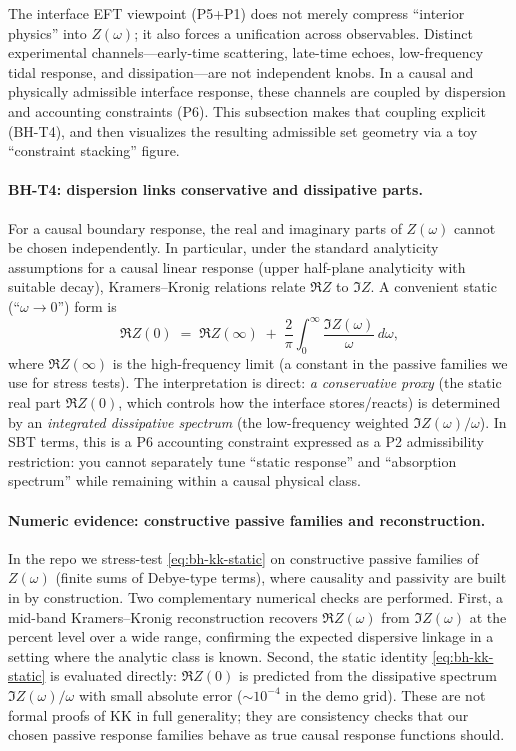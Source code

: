 
The interface EFT viewpoint (P5+P1) does not merely compress ``interior physics'' into $Z(\omega)$; it also forces a unification across observables. Distinct experimental channels---early-time scattering, late-time echoes, low-frequency tidal response, and dissipation---are not independent knobs. In a causal and physically admissible interface response, these channels are coupled by dispersion and accounting constraints (P6). This subsection makes that coupling explicit (BH-T4), and then visualizes the resulting admissible set geometry via a toy ``constraint stacking'' figure.

\paragraph{BH-T4: dispersion links conservative and dissipative parts.}
For a causal boundary response, the real and imaginary parts of $Z(\omega)$ cannot be chosen independently. In particular, under the standard analyticity assumptions for a causal linear response (upper half-plane analyticity with suitable decay), Kramers--Kronig relations relate $\Re Z$ to $\Im Z$. A convenient static (``$\omega\to 0$'') form is
\begin{equation}
  \Re Z(0) \;=\; \Re Z(\infty) \; + \; \frac{2}{\pi}\int_{0}^{\infty}\frac{\Im Z(\omega)}{\omega}\,d\omega,
  \label{eq:bh-kk-static}
\end{equation}
where $\Re Z(\infty)$ is the high-frequency limit (a constant in the passive families we use for stress tests). The interpretation is direct: \emph{a conservative proxy} (the static real part $\Re Z(0)$, which controls how the interface stores/reacts) is determined by an \emph{integrated dissipative spectrum} (the low-frequency weighted $\Im Z(\omega)/\omega$). In SBT terms, this is a P6 accounting constraint expressed as a P2 admissibility restriction: you cannot separately tune ``static response'' and ``absorption spectrum'' while remaining within a causal physical class.

\paragraph{Numeric evidence: constructive passive families and reconstruction.}
In the repo we stress-test \eqref{eq:bh-kk-static} on constructive passive families of $Z(\omega)$ (finite sums of Debye-type terms), where causality and passivity are built in by construction. Two complementary numerical checks are performed. First, a mid-band Kramers--Kronig reconstruction recovers $\Re Z(\omega)$ from $\Im Z(\omega)$ at the percent level over a wide range, confirming the expected dispersive linkage in a setting where the analytic class is known. Second, the static identity \eqref{eq:bh-kk-static} is evaluated directly: $\Re Z(0)$ is predicted from the dissipative spectrum $\Im Z(\omega)/\omega$ with small absolute error ($\sim 10^{-4}$ in the demo grid). These are not formal proofs of KK in full generality; they are consistency checks that our chosen passive response families behave as true causal response functions should.

